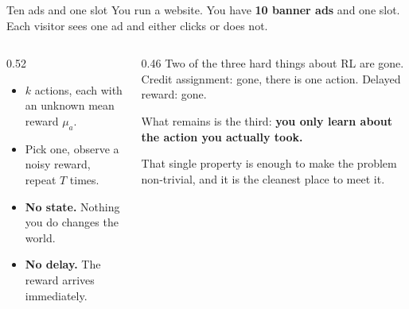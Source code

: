\documentclass[aspectratio=169]{beamer}
\begin{document}
\begin{frame}{Ten ads and one slot}
  You run a website. You have \textbf{10 banner ads} and one slot. Each visitor sees one ad and
  either clicks or does not.

  \vskip 8pt
  \begin{columns}[T]
    \begin{column}{0.52\textwidth}
      \begin{tcolorbox}[colback=armblue!8, colframe=armblue, boxrule=0.6pt, arc=2pt,
                        title={\textbf{The $k$-armed bandit}}]
        \small
        \begin{itemize}\itemsep3pt
          \item $k$ actions, each with an unknown mean reward $\mu_a$.
          \item Pick one, observe a noisy reward, repeat $T$ times.
          \item \textbf{No state.} Nothing you do changes the world.
          \item \textbf{No delay.} The reward arrives immediately.
        \end{itemize}
      \end{tcolorbox}
    \end{column}
    \begin{column}{0.46\textwidth}
      \vskip 4pt
      \small
      Two of the three hard things about RL are gone. Credit assignment: gone, there is one
      action. Delayed reward: gone.

      \vskip 6pt
      What remains is the third: \textbf{you only learn about the action you actually took.}

      \vskip 6pt
      That single property is enough to make the problem non-trivial, and it is the cleanest
      place to meet it.
    \end{column}
  \end{columns}
\end{frame}
\end{document}
